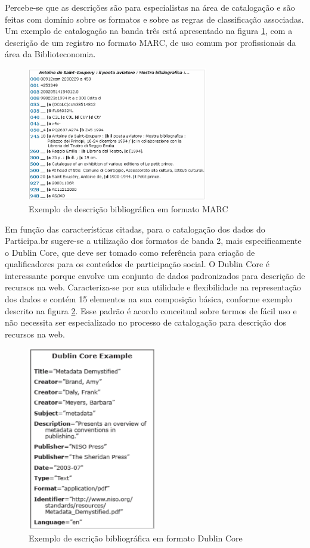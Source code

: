 Percebe-se que as descrições são para especialistas na área de catalogação e são feitas com domínio sobre os formatos e sobre as regras de classificação associadas. Um exemplo de catalogação na banda três está apresentado na figura \ref{fig:marc2}, com a descrição de um registro no formato MARC, de uso comum por profissionais da área da Biblioteconomia.

\graphicspath{{figuras/}}
\begin{figure}[H]
\centering
\includegraphics[width=0.7\textwidth]{marc2}
\caption{Exemplo de descrição bibliográfica em formato MARC}
\label{fig:marc2}
\end{figure}

Em função das características citadas, para o catalogação dos dados do Participa.br sugere-se a utilização dos formatos de banda 2, mais especificamente o Dublin Core, que deve ser tomado como referência para criação de qualificadores para os conteúdos de participação social. O Dublin Core é interessante porque envolve um conjunto de dados padronizados para descrição de recursos na web. Caracteriza-se por sua utilidade e flexibilidade na representação dos dados e contém 15 elementos na sua composição básica, conforme exemplo descrito na figura \ref{fig:exdublincore}. Esse padrão é acordo conceitual sobre termos de fácil uso e não necessita ser especializado no processo de catalogação para descrição dos recursos na web.

\graphicspath{{figuras/}}
\begin{figure}[H]
\centering
\includegraphics[width=0.5\textwidth]{exemplo_dublincore}
\caption{Exemplo de escrição bibliográfica em formato Dublin Core}
\label{fig:exdublincore}
\end{figure}



